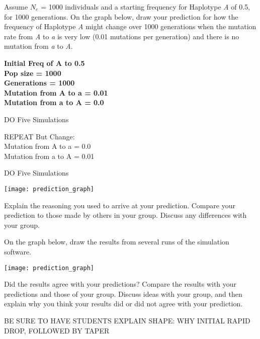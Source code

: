 \documentclass[11pt, addpoints]{exam}
\begin{document}
\begin{questions}

\question
Assume $N_e$ = 1000 individuals and a
starting frequency for Haplotype \emph{A} of 0.5, for 1000 generations. On the graph below,
draw your prediction for how the frequency of Haplotype \emph{A} might
change over 1000 generations when the mutation rate from \emph{A} to \emph{a} is very low
(0.01 mutations per generation) and there is no mutation from \emph{a}
to \emph{A}. 

\ifprintanswers
	{\bfseries Initial Freq of A to 0.5 \\	
	Pop size = 1000\\	
	Generations = 1000\\
	Mutation from A to a = 0.01\\
	Mutation from a to A = 0.0

	DO Five Simulations
	
	\vspace{\baselineskip}
	
	REPEAT But Change:\\	
	Mutation from A to a = 0.0\\
	Mutation from a to A = 0.01
	
	DO Five Simulations}\vspace{9\baselineskip}
\else
		\begin{center}
			\texttt{[image: prediction\_graph]}
		\end{center}
\fi

\question[1]
Explain the reasoning you used to arrive at your
prediction. Compare your prediction to those made by others in your
group. Discuss any differences with your group.%

\newpage

\question On the graph below, draw the results from several runs of
the simulation software.

\begin{center}
	\texttt{[image: prediction\_graph]}
\end{center}

\question
Did the results agree with your predictions? Compare the
results with your predictions and those of your group. Discuss ideas
with your group, and then explain why you think your results did or did
not agree with your prediction.%

\begin{solution}
BE SURE TO HAVE STUDENTS EXPLAIN SHAPE: WHY INITIAL RAPID DROP, FOLLOWED BY TAPER


\end{solution}
\end{questions}
\end{document}
